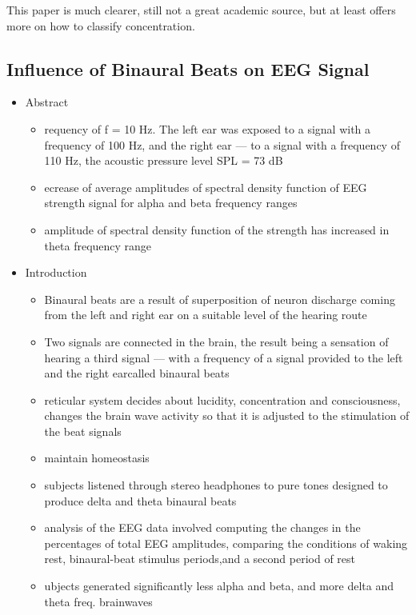 \documentclass[a4paper]{article}
\begin{document}
This paper is much clearer, still not a great academic source, but at least offers more on how to classify concentration.

\subsection*{Influence of Binaural Beats on EEG Signal}

\begin{itemize}
    \item Abstract
          \begin{itemize}
              \item requency of
                    f = 10 Hz. The left ear was exposed to a signal with a frequency of 100 Hz, and the right ear — to a signal with a frequency of 110 Hz, the acoustic pressure level SPL = 73 dB
              \item ecrease of average amplitudes of spectral density function of EEG strength signal for alpha and beta frequency ranges
              \item amplitude of spectral density function of the strength has increased in theta frequency range
          \end{itemize}
    \item Introduction
          \begin{itemize}
              \item Binaural beats are a result of superposition of neuron discharge coming from the left and right ear on a suitable level of the hearing route
              \item Two signals are connected in the brain, the result being
                    a sensation of hearing a third signal — with a frequency of a signal provided to the left and the right earcalled binaural beats
              \item reticular system decides about lucidity, concentration and consciousness, changes the brain wave activity so that it is adjusted to the stimulation of the beat signals
              \item maintain homeostasis
              \item subjects listened through stereo headphones to pure tones designed to produce delta and theta binaural beats
              \item analysis of the EEG data involved computing the changes in the percentages of total EEG amplitudes, comparing the conditions of waking rest, binaural-beat stimulus periods,and a second period of rest
              \item ubjects generated significantly less alpha and beta, and more delta and theta freq. brainwaves

\end{itemize}
\end{itemize}
\end{document}
